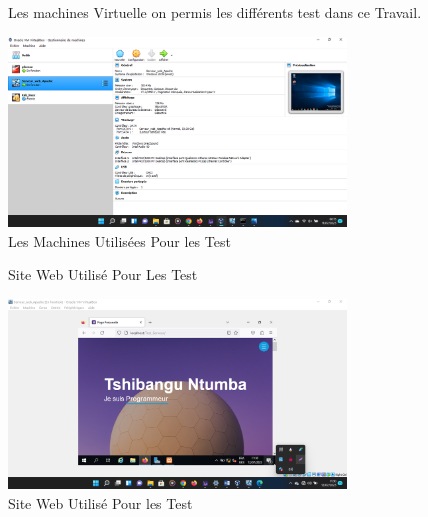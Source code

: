 \begin{figure}[h]
	Les machines Virtuelle on permis les différents test dans ce Travail.
	 \begin{center}
	 	\includegraphics[width=0.8\textwidth]{PhotoMemoire/machineutilisee.png}
	 	\caption{ Les Machines Utilisées Pour les Test}	
	 \end{center}
\end{figure}
\begin{figure}[h]
	 Site Web Utilisé Pour Les Test
	\begin{center}
		\includegraphics[width=0.8\textwidth]{PhotoMemoire/serveur _Web.png}
		\caption{ Site Web Utilisé Pour les Test}
	\end{center}
\end{figure}



